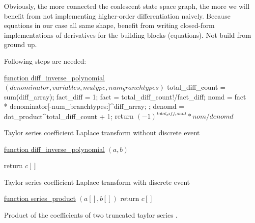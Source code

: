 \documentclass[10pt, a4]{article}
\begin{document}
Obviously, the more connected the coalescent state space graph, the more we will benefit from not implementing higher-order differentiation naively.
Because equations in our case all same shape, benefit from writing closed-form implementations of derivatives for the building blocks (equations). Not build from ground up.

Following steps are needed:


\begin{algorithm}

    \underline{function diff_inverse_polynomial} $(denominator, variables, mutype, num_branchtypes)$\;
    \Input{}
    total_diff_count = sum(diff_array);
    fact_diff = 1;
    fact = total_diff_count!/fact_diff;
    nomd = fact * denominator[-num_branchtypes:]^diff_array;
    ;
    denomd = dot_product^{total_diff_count + 1;}
    {return $(-1)^{total_diff_count}*nom/denomd$\;}
    \caption{Taylor series coefficient Laplace transform without discrete event}
\end{algorithm}

\begin{algorithm}

    \underline{function diff_inverse_polynomial} $(a, b)$\;
    
    {return $c[ ]$\;}
    \caption{Taylor series coefficient Laplace transform with discrete event}
\end{algorithm}

\begin{algorithm}

    \underline{function series\_product} $(a[ ],b[ ])$\;
    {return $c[ ]$\;}
    \caption{Product of the coefficients of two truncated taylor series \citep{Neidinger2013}.}
\end{algorithm}
\end{document}
